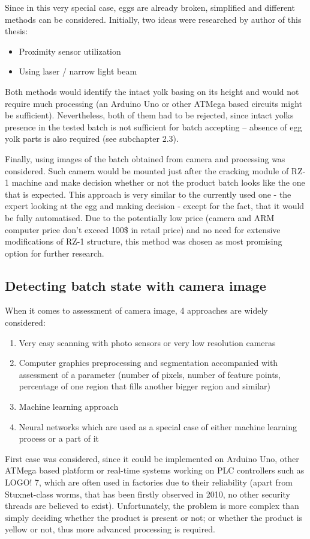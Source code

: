 \documentclass[12pt,twoside,a4paper]{article}
\begin{document}
Since in this very special case, eggs are already broken, simplified and different methods can be considered.
Initially, two ideas were researched by author of this thesis:
\begin{itemize}
\item Proximity sensor utilization
\item Using laser / narrow light beam 
\end{itemize}
Both methods would identify the intact yolk basing on its height and would not require much processing (an Arduino Uno or other ATMega based circuits might be sufficient).
Nevertheless, both of them had to be rejected, since intact yolks presence in the tested batch is not sufficient for batch accepting – absence of egg yolk parts is also required (see subchapter 2.3).

Finally, using images of the batch obtained from camera and processing was considered. Such camera would be mounted just after the cracking module of RZ-1 machine and make decision whether or not the product batch looks like the one that is expected.
This approach is very similar to the currently used one - the expert looking at the egg and making decision - except for the fact, that it would be fully automatised.
Due to the potentially low price (camera and ARM computer price don't exceed 100\$ in retail price) and no need for extensive modifications of RZ-1 structure, this method was chosen as most promising option for further research.



\subsection{Detecting batch state with camera image}

When it comes to assessment of camera image, 4 approaches are widely considered:
\begin{enumerate}
\item Very easy scanning with photo sensors or very low resolution cameras
\item Computer graphics preprocessing and segmentation accompanied with assessment of a parameter (number of pixels, number of feature points, percentage of one region that fills another bigger region and similar)
\item Machine learning approach
\item Neural networks which are used as a special case of either machine learning process or a part of it 
\end{enumerate}
First case was considered, since it could be implemented on Arduino Uno, other ATMega based platform or real-time systems working on PLC controllers such as LOGO! 7, which are often used in factories due to their reliability (apart from Stuxnet-class worms, that has been firstly observed in 2010, no other security threads are believed to exist).
Unfortunately, the problem is more complex than simply deciding whether the product is present or not; or whether the product is yellow or not, thus more advanced processing is required.
\end{document}
